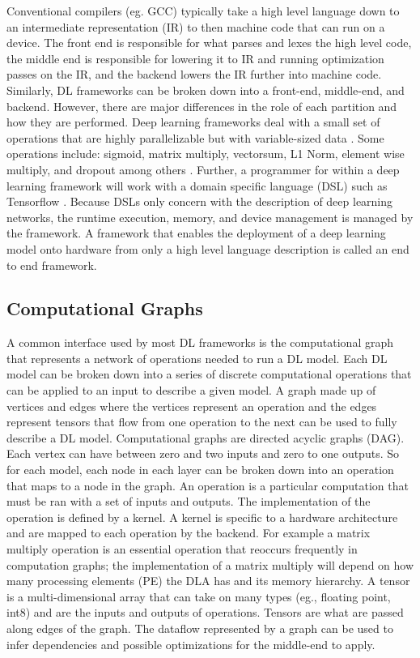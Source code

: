 Conventional compilers (eg. GCC) typically take a high level language down to
an intermediate representation (IR) to then machine code that can run on a
device.  The front end is responsible for what parses and lexes the high level
code, the middle end is responsible for lowering it to IR and running
optimization passes on the IR, and the backend lowers the IR further into
machine code. Similarly, DL frameworks can be broken down into a front-end,
middle-end, and backend. However, there are major differences in the role of
each partition and how they are performed.  Deep learning frameworks deal with
a small set of operations that are highly parallelizable but with
variable-sized data \cite{nGraph}. Some operations include: sigmoid, matrix
multiply, vectorsum, L1 Norm, element wise multiply, and dropout among others
\cite{cntk}. Further, a programmer for within a deep learning framework will
work with a domain specific language (DSL) such as Tensorflow
\cite{tensorflow}. Because DSLs only concern with the description of deep
learning networks, the runtime execution, memory, and device management is
managed by the framework. A framework that enables the deployment of a deep
learning model onto hardware from only a high level language description is
called an end to end framework.

\subsection{Computational Graphs}
A common interface used by most DL frameworks is the computational graph
\cite{tensorflow} \cite{cntk} that represents a network of operations needed to
run a DL model. Each DL model can be broken down into a series of discrete
computational operations that can be applied to an input to describe a given
model. A graph made up of vertices and edges where the vertices represent an
operation and the edges represent tensors that flow from one operation to the
next can be used to fully describe a DL model. Computational graphs are
directed acyclic graphs (DAG).  Each vertex can have between zero and two
inputs and zero to one outputs. So for each model, each node in each layer can
be broken down into an operation that maps to a node in the graph. An operation
is a particular computation that must be ran with a set of inputs and outputs.
The implementation of the operation is defined by a kernel. A kernel is
specific to a hardware architecture and are mapped to each operation by the
backend. For example a matrix multiply operation is an essential operation
that reoccurs frequently in computation graphs; the implementation of a matrix
multiply will depend on how many processing elements (PE) the DLA has and its
memory hierarchy. A tensor is a multi-dimensional array that can take on many
types (eg., floating point, int8) and are the inputs and outputs of operations.
Tensors are what are passed along edges of the graph. The dataflow represented
by a graph can be used to infer dependencies and possible optimizations for the
middle-end to apply.

